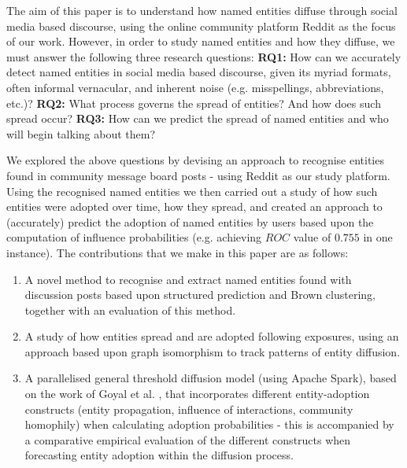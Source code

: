 \documentclass[10pt,journal,compsoc]{IEEEtran}
\begin{document}
The aim of this paper is to understand how named entities diffuse through social media based discourse, using the online community platform Reddit as the focus of our work.
However, in order to study named entities and how they diffuse, we must answer the following three research questions: \textbf{RQ1:} How can we accurately detect named entities in social media based discourse, given its myriad formats, often informal vernacular, and inherent noise (e.g. misspellings, abbreviations, etc.)? \textbf{RQ2:} What process governs the spread of entities? And how does such spread occur? \textbf{RQ3:} How can we predict the spread of named entities and who will begin talking about them?	

We explored the above questions by devising an approach to recognise entities found in community message board posts - using Reddit as our study platform.
Using the recognised named entities we then carried out a study of how such entities were adopted over time, how they spread, and created an approach to (accurately) predict the adoption of named entities by users based upon the computation of influence probabilities (e.g. achieving $ROC$ value of $0.755$ in one instance).
The contributions that we make in this paper are as follows:

\begin{enumerate}
	\item A novel method to recognise and extract named entities found with discussion posts based upon structured prediction and Brown clustering, together with an evaluation of this method.
	\item A study of how entities spread and are adopted following exposures, using an approach based upon graph isomorphism to track patterns of entity diffusion.
	\item A parallelised general threshold diffusion model (using Apache Spark), based on the work of Goyal et al. \cite{goyal2010learning}, that incorporates different entity-adoption constructs (entity propagation, influence of interactions, community homophily) when calculating adoption probabilities - this is accompanied by a comparative empirical evaluation of the different constructs when forecasting entity adoption within the diffusion process.
\end{enumerate}
\end{document}

